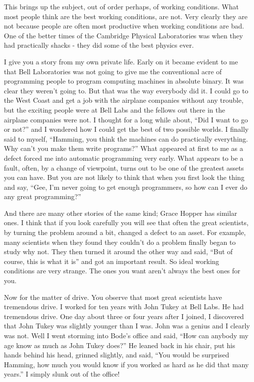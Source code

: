 \documentclass{article}
\begin{document}
This brings up the subject, out of order perhaps, of working conditions. What most people think are the best working conditions, are not. Very clearly they are not because people are often most productive when working conditions are bad. One of the better times of the Cambridge Physical Laboratories was when they had practically shacks - they did some of the best physics ever.

I give you a story from my own private life. Early on it became evident to me that Bell Laboratories was not going to give me the conventional acre of programming people to program computing machines in absolute binary. It was clear they weren't going to. But that was the way everybody did it. I could go to the West Coast and get a job with the airplane companies without any trouble, but the exciting people were at Bell Labs and the fellows out there in the airplane companies were not. I thought for a long while about, ``Did I want to go or not?'' and I wondered how I could get the best of two possible worlds. I finally said to myself, ``Hamming, you think the machines can do practically everything. Why can't you make them write programs?'' What appeared at first to me as a defect forced me into automatic programming very early. What appears to be a fault, often, by a change of viewpoint, turns out to be one of the greatest assets you can have. But you are not likely to think that when you first look the thing and say, ``Gee, I'm never going to get enough programmers, so how can I ever do any great programming?''

And there are many other stories of the same kind; Grace Hopper has similar ones. I think that if you look carefully you will see that often the great scientists, by turning the problem around a bit, changed a defect to an asset. For example, many scientists when they found they couldn't do a problem finally began to study why not. They then turned it around the other way and said, ``But of course, this is what it is'' and got an important result. So ideal working conditions are very strange. The ones you want aren't always the best ones for you.

Now for the matter of drive. You observe that most great scientists have tremendous drive. I worked for ten years with John Tukey at Bell Labs. He had tremendous drive. One day about three or four years after I joined, I discovered that John Tukey was slightly younger than I was. John was a genius and I clearly was not. Well I went storming into Bode's office and said, ``How can anybody my age know as much as John Tukey does?'' He leaned back in his chair, put his hands behind his head, grinned slightly, and said, ``You would be surprised Hamming, how much you would know if you worked as hard as he did that many years.'' I simply slunk out of the office!
\end{document}
